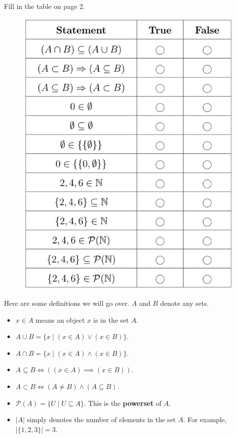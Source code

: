 Fill in the table on page 2.
\begin{figure}[ht]
    \centering
    \includegraphics{Ch3/004.PNG}
    \label{fig:tf}
\end{figure}

Here are some definitions we will go over. $A$ and $B$ denote any sets.
\begin{itemize}
    \item $x \in A$ means an object $x$ is in the set $A$.
    \item $A \cup B = \{x \mid (x \in A) \lor (x \in B)\}$.
    \item $A \cap B = \{x \mid (x \in A) \land (x \in B)\}$.
    \item $A \subseteq B \iff ((x \in A) \implies (x \in B))$.
    \item $A \subset B \iff (A \neq B) \land (A \subseteq B)$.
    \item $\mathcal{P}(A) = \{U \mid U \subseteq A\}$. This is the \textbf{powerset} of $A$. 
    \item $|A|$ simply denotes the number of elements in the set $A$. For example, $|\{1, 2, 3\}| = 3$.
\end{itemize}